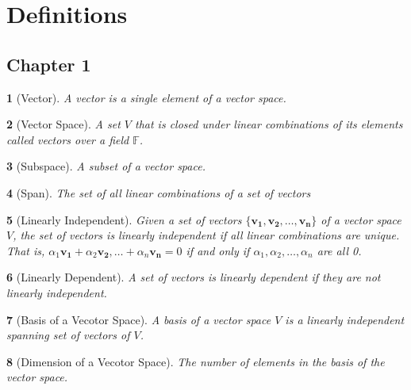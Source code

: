 \documentclass{article}
\theoremstyle{bolddef}
\newtheorem*{definition}{}
\begin{document}
\section*{Definitions}

\subsection*{Chapter 1}

\begin{definition}[Vector]
    A vector is a single element of a vector space.
\end{definition}

\begin{definition}[Vector Space]
    A set $\mathit{V}$ that is closed under linear combinations of its elements called vectors over a field $\mathbb{F}$.
\end{definition}

\begin{definition}[Subspace]
    A subset of a vector space.
\end{definition}

\begin{definition}[Span]
    The set of all linear combinations of a set of vectors
\end{definition}

\begin{definition}[Linearly Independent]
    Given a set of vectors $\{\mathbf{v_1}, \mathbf{v_2}, \ldots, \mathbf{v_n}\}$ of a vector space
    $\mathit{V}$, the set of vectors is linearly independent if all linear combinations
    are unique. That is, $\alpha_1 \mathbf{v_1} + \alpha_2 \mathbf{v_2}, \ldots + \alpha_n \mathbf{v_n} = 0$
    if and only if $\alpha_1, \alpha_2, \ldots, \alpha_n$ are all 0.
\end{definition}

\begin{definition}[Linearly Dependent]
    A set of vectors is linearly dependent if they are not linearly independent.
\end{definition}

\begin{definition}[Basis of a Vecotor Space]
    A basis of a vector space $\mathit{V}$ is a linearly independent spanning set of vectors of $\mathit{V}$.
\end{definition}

\begin{definition}[Dimension of a Vecotor Space]
    The number of elements in the basis of the vector space.
\end{definition}
\end{document}
